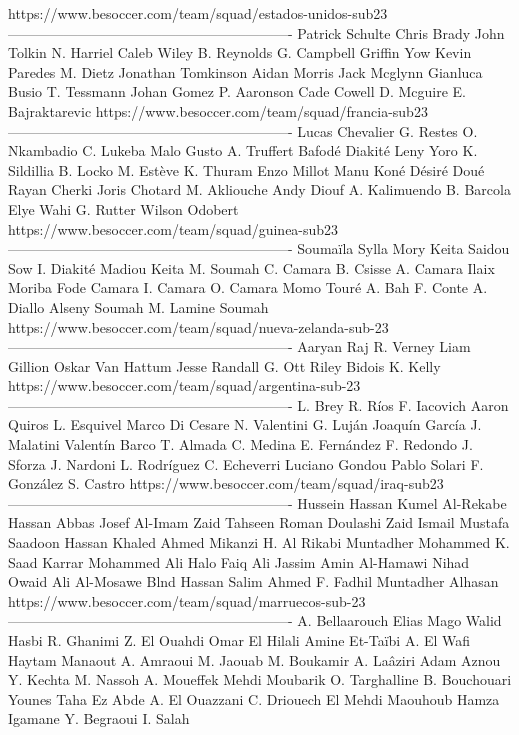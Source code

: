 https://www.besoccer.com/team/squad/estados-unidos-sub23 
------------------------------------------------------------- 
Patrick Schulte
Chris Brady
John Tolkin
N. Harriel
Caleb Wiley
B. Reynolds
G. Campbell
Griffin Yow
Kevin Paredes
M. Dietz
Jonathan Tomkinson
Aidan Morris
Jack Mcglynn
Gianluca Busio
T. Tessmann
Johan Gomez
P. Aaronson
Cade Cowell
D. Mcguire
E. Bajraktarevic
https://www.besoccer.com/team/squad/francia-sub23 
------------------------------------------------------------- 
Lucas Chevalier
G. Restes
O. Nkambadio
C. Lukeba
Malo Gusto
A. Truffert
Bafodé Diakité
Leny Yoro
K. Sildillia
B. Locko
M. Estève
K. Thuram
Enzo Millot
Manu Koné
Désiré Doué
Rayan Cherki
Joris Chotard
M. Akliouche
Andy Diouf
A. Kalimuendo
B. Barcola
Elye Wahi
G. Rutter
Wilson Odobert
https://www.besoccer.com/team/squad/guinea-sub23 
------------------------------------------------------------- 
Soumaïla Sylla
Mory Keita
Saidou Sow
I. Diakité
Madiou Keita
M. Soumah
C. Camara
B. Csisse
A. Camara
Ilaix Moriba
Fode Camara
I. Camara
O. Camara
Momo Touré
A. Bah
F. Conte
A. Diallo
Alseny Soumah
M. Lamine Soumah
https://www.besoccer.com/team/squad/nueva-zelanda-sub-23 
------------------------------------------------------------- 
Aaryan Raj
R. Verney
Liam Gillion
Oskar Van Hattum
Jesse Randall
G. Ott
Riley Bidois
K. Kelly
https://www.besoccer.com/team/squad/argentina-sub-23 
------------------------------------------------------------- 
L. Brey
R. Ríos
F. Iacovich
Aaron Quiros
L. Esquivel
Marco Di Cesare
N. Valentini
G. Luján
Joaquín García
J. Malatini
Valentín Barco
T. Almada
C. Medina
E. Fernández
F. Redondo
J. Sforza
J. Nardoni
L. Rodríguez
C. Echeverri
Luciano Gondou
Pablo Solari
F. González
S. Castro
https://www.besoccer.com/team/squad/iraq-sub23 
------------------------------------------------------------- 
Hussein Hassan
Kumel Al-Rekabe
Hassan Abbas
Josef Al-Imam
Zaid Tahseen
Roman Doulashi
Zaid Ismail
Mustafa Saadoon
Hassan Khaled
Ahmed Mikanzi
H. Al Rikabi
Muntadher Mohammed
K. Saad
Karrar Mohammed Ali
Halo Faiq
Ali Jassim
Amin Al-Hamawi
Nihad Owaid
Ali Al-Mosawe
Blnd Hassan
Salim Ahmed
F. Fadhil
Muntadher Alhasan
https://www.besoccer.com/team/squad/marruecos-sub-23 
------------------------------------------------------------- 
A. Bellaarouch
Elias Mago
Walid Hasbi
R. Ghanimi
Z. El Ouahdi
Omar El Hilali
Amine Et-Taïbi
A. El Wafi
Haytam Manaout
A. Amraoui
M. Jaouab
M. Boukamir
A. Laâziri
Adam Aznou
Y. Kechta
M. Nassoh
A. Moueffek
Mehdi Moubarik
O. Targhalline
B. Bouchouari
Younes Taha
Ez Abde
A. El Ouazzani
C. Driouech
El Mehdi Maouhoub
Hamza Igamane
Y. Begraoui
I. Salah
